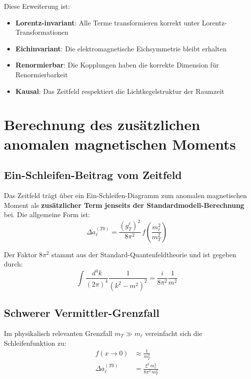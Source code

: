 \documentclass[12pt,a4paper]{article}
\theoremstyle{definition}
\begin{document}
	Diese Erweiterung ist:
	\begin{itemize}
		\item \textbf{Lorentz-invariant}: Alle Terme transformieren korrekt unter Lorentz-Transformationen
		\item \textbf{Eichinvariant}: Die elektromagnetische Eichsymmetrie bleibt erhalten
		\item \textbf{Renormierbar}: Die Kopplungen haben die korrekte Dimension für Renormierbarkeit
		\item \textbf{Kausal}: Das Zeitfeld respektiert die Lichtkegelstruktur der Raumzeit
	\end{itemize}
	
	\section{Berechnung des zusätzlichen anomalen magnetischen Moments}
	
	\subsection{Ein-Schleifen-Beitrag vom Zeitfeld}
	
	Das Zeitfeld trägt über ein Ein-Schleifen-Diagramm zum anomalen magnetischen Moment als \textbf{zusätzlicher Term jenseits der Standardmodell-Berechnung} bei. Die allgemeine Form ist\cite{peskin_schroeder_1995}:
	\begin{equation}
		\Delta a_\ell^{(T0)} = \frac{(g_T^\ell)^2}{8\pi^2} \, f\!\left(\frac{m_\ell^2}{m_T^2}\right)
		\label{eq:one_loop_general}
	\end{equation}
	
	Der Faktor $8\pi^2$ stammt aus der Standard-Quantenfeldtheorie und ist gegeben durch:
	\begin{equation}
		\int \frac{d^4k}{(2\pi)^4} \frac{1}{(k^2 - m^2)^2} = \frac{i}{8\pi^2} \frac{1}{m^2}
	\end{equation}
	
	\subsection{Schwerer Vermittler-Grenzfall}
	
	Im physikalisch relevanten Grenzfall $m_T \gg m_\ell$ vereinfacht sich die Schleifenfunktion zu:
	\begin{align}
		f(x \to 0) &\approx \frac{1}{m_T^2} \label{eq:heavy_mediator_limit}\\
		\Delta a_\ell^{(T0)} &= \frac{\xi^2 \, m_\ell^2}{8\pi^2 \, m_T^2} \label{eq:anomaly_intermediate}
	\end{align}
	
\end{document}
